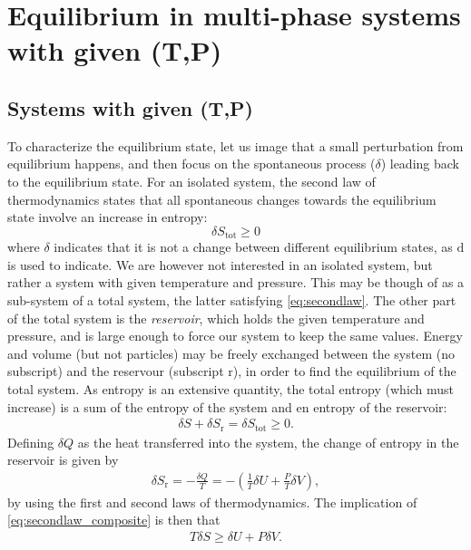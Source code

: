 \documentclass[english]{../thermomemo/thermomemo}
\begin{document}
\section{Equilibrium in multi-phase systems with given (T,P)}
\subsection{Systems with given (T,P)}
\label{sec:eq_givenTP}
To characterize the equilibrium state, let us image that a small perturbation from equilibrium happens, and then focus on 
the spontaneous process ($\delta$) leading back to the equilibrium state. 
For an isolated system, the second law of thermodynamics states that all spontaneous changes towards the equilibrium 
state involve an increase in entropy:
\begin{equation}
  \delta S_\text{tot} \geq 0
  \label{eq:secondlaw}
\end{equation}
where $\delta$ indicates that it is not a change between different equilibrium states, as $\mathrm{d}$ is used to indicate. 
We are however not interested in an isolated system, but rather a system with given temperature and pressure. This may be though of as a sub-system of a total 
system, the latter satisfying \eqref{eq:secondlaw}. The other part of the total system is the \textit{reservoir}, which holds the given temperature and 
pressure, and is large enough to force our system to keep the same values. Energy and volume (but not particles) 
may be freely exchanged between the system (no subscript) and 
the reservour (subscript r), in order to find the equilibrium of the total system. As entropy is an extensive quantity, the total entropy (which must increase) is 
a sum of the entropy of the system and en entropy of the reservoir:
\begin{align}
  \delta S  + \delta S_\text{r} = \delta S_\text{tot} \geq 0.
  \label{eq:secondlaw_composite}
\end{align}
Defining $\delta Q$ as the heat transferred into the system, the change of entropy in the reservoir is given by
\begin{align}
  \delta S_\text{r} = - \frac{\delta Q}{T} = - \left( \frac{1}{T}\delta U + \frac{P}{T} \delta V \right),
  \label{}
\end{align}
by using the first and second laws of thermodynamics. The implication of \eqref{eq:secondlaw_composite} is then that
\begin{align}
  T \delta S \geq \delta U +  P \delta V.
  \label{eq:TdS}
\end{align}
\end{document}

